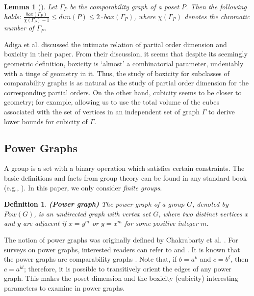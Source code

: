 \documentclass[twoside, 11pt]{article}
\newtheorem{definition}{Definition}
\newtheorem{lemma}{Lemma}
\newcommand{\G}{\Gamma}
\begin{document}
\begin{lemma}[\cite{adiga2011boxicity}]\label{poset dim and boxicity}
Let $\G_P$ be the comparability graph of a poset $P$. Then the following holds: $\frac{box(\G_P)}{\chi(\G_P)-1} \leq dim(P) \leq 2\cdot box(\G_P)$, where $\chi(\G_P)$ denotes the chromatic number of $\G_P$.
\end{lemma}

Adiga et al. \cite{adiga2011boxicity} discussed the intimate relation of partial order dimension and boxicity in their paper. From their discussion, it seems that despite its seemingly geometric definition, boxicity is `almost' a combinatorial parameter, undeniably with a tinge of geometry in it. Thus, the study of boxicity for subclasses of comparability graphs is as natural as the study of partial order dimension for the corresponding partial orders. On the other hand, cubicity seems to be closer to geometry; for example, allowing us to use the total volume of the cubes associated with the set of vertices in an independent set of graph $\G$ to derive lower bounds for cubicity of $\G$.

\subsection{Power Graphs}\label{sec: power graphs}

A group is a set with a binary operation which satisfies certain constraints. The basic definitions and facts from group theory can be found in any standard book (e.g.,  \cite{rotman2012introduction}). In this paper, we only consider \emph{finite groups}. 


\begin{definition}\label{def power graph}\textbf{(Power graph)}
    The \emph{power graph} of a group $G$, denoted by $Pow(G)$, is an undirected graph with vertex set $G$, where two distinct vertices $x$ and $y$ are adjacent if $x=y^m$ or $y=x^m$ for some positive integer $m$.
\end{definition}

The notion of power graphs was originally defined by Chakrabarty et al. \cite{chakrabarty2009undirected}. For surveys on power graphs,  interested readers can refer to \cite{abawajy2013power} and \cite{kumar2021recent}. It is known that the power graphs are comparability graphs \cite{feng2014power, aalipour2017structure}. Note that, if $b = a^k$ and $c=b^\ell$, then $c = a^{kl}$; therefore, it is possible to transitively orient the edges of any power graph. This makes the poset dimension and the boxicity (cubicity) interesting parameters to examine in power graphs.
\end{document}
